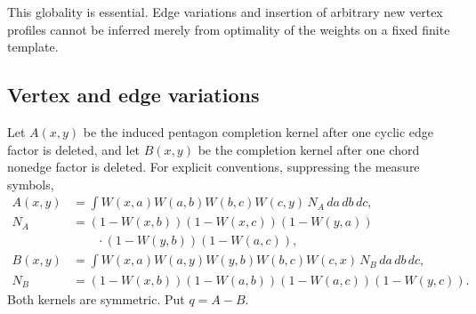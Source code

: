 \documentclass[11pt]{amsart}
\theoremstyle{definition}
\theoremstyle{remark}
\begin{document}
This globality is essential. Edge variations and insertion of arbitrary
new vertex profiles cannot be inferred merely from optimality of the
weights on a fixed finite template.

\subsection{Vertex and edge variations}

Let \(A(x,y)\) be the induced pentagon completion kernel after one cyclic
edge factor is deleted, and let \(B(x,y)\) be the completion kernel after
one chord nonedge factor is deleted. For explicit conventions, suppressing
the measure symbols,
\begin{align*}
 A(x,y)&=\int W(x,a)W(a,b)W(b,c)W(c,y)\,N_A\,da\,db\,dc,\\
 N_A&=(1-W(x,b))(1-W(x,c))(1-W(y,a))\\
    &\hspace{2em}\cdot(1-W(y,b))(1-W(a,c)),\\
 B(x,y)&=\int W(x,a)W(a,y)W(y,b)W(b,c)W(c,x)\,N_B\,da\,db\,dc,\\
 N_B&=(1-W(x,b))(1-W(a,b))(1-W(a,c))(1-W(y,c)).
\end{align*}
Both kernels are symmetric. Put \(q=A-B\).
\end{document}
